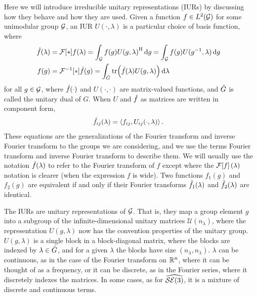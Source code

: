 \documentclass[../../main.tex]{subfiles}
\begin{document}
\begin{refsection}
	Here we will introduce irreducible unitary representations (IURs) by discussing how they behave and how they are used.
	Given a function $f \in L^2(\mathcal{G})$ for some unimodular group $\mathcal{G}$, an IUR $U(\cdot, \lambda)$ is a particular choice of basis function, where
	\begin{align}
		\hat{f}(\lambda) & = \mathcal{F}\qty[*]{f}(\lambda) = \int_{\mathcal{G}} f(g) {U(g, \lambda)}^\mathrm{H} \dd{g}
		= \int_{\mathcal{G}} f(g) U(g^{-1}, \lambda) \dd{g}  \label{fouriertrans}                                                                      \\
		f(g)              & = \mathcal{F}^{-1}\qty[*]{\hat{f}}(g) = \int_{\hat{G}} \tr(\hat{f}(\lambda) U(g, \lambda)) \dd{\lambda} \label{fourierinvtrans}
	\end{align}
	for all $g \in \mathcal{G}$, where $\hat{f}( \cdot )$ and $U(\cdot, \cdot)$ are matrix-valued functions, and $\hat{G}$ is called the unitary dual of $G$.
	When $U$ and $\hat{f}$ as matrices are written in component form,
	$$\hat{f}_{ij}(\lambda) = \left\langle f_{ij}, U_{ij}(\cdot, \lambda) \right\rangle.$$
	These equations are the generalizations of the Fourier transform and inverse Fourier transform to the groups we are considering, and we use the terms Fourier transform and inverse Fourier transform to describe them.
	We will usually use the notation $\hat{f}(\lambda)$ to refer to the Fourier transform of $f$ except where the $\mathcal{F}\qty[f](\lambda)$ notation is clearer (\eg when the expression $f$ is wide).
	Two functions $f_1(g)$ and $f_2(g)$ are equivalent if and only if their Fourier transforms $\hat{f}_1(\lambda)$ and $\hat{f}_2(\lambda)$ are identical.

	The IURs are unitary representations of $\mathcal{G}$.
	That is, they map a group element $g$ into a subgroup of the infinite-dimensional unitary matrices $\mathcal{U}(n_\lambda)$, where the representation $U(g, \lambda)$ now has the convention properties of the unitary group.
	$U(g, \lambda)$ is a single block in a block-diagonal matrix, where the blocks are indexed by $\lambda \in \hat{G}$, and for a given $\lambda$ the blocks have size $(n_\lambda, n_\lambda)$.
	$\lambda$ can be continuous, as in the case of the Fourier transform on $\mathbb{R}^n$, where it can be thought of as a frequency, or it can be discrete, as in the Fourier series, where it discretely indexes the matrices.
	In some cases, as for $\widehat{\mathcal{SE} (3)}$, it is a mixture of discrete and continuous terms.


\end{refsection}
\end{document}
